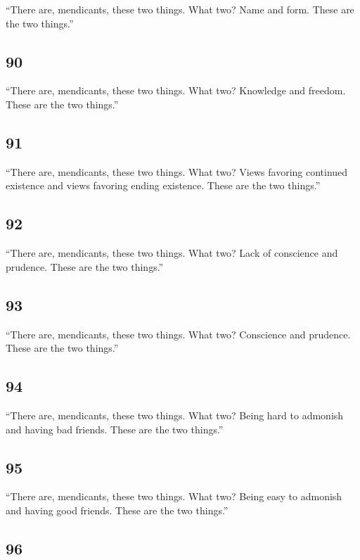 \documentclass[12pt,openany]{book}%
\begin{document}
“There are, mendicants, these two things. What two? Name and form. These are the two things.” 

\subsection*{90 }

“There are, mendicants, these two things. What two? Knowledge and freedom. These are the two things.” 

\subsection*{91 }

“There are, mendicants, these two things. What two? Views favoring continued existence and views favoring ending existence. These are the two things.” 

\subsection*{92 }

“There are, mendicants, these two things. What two? Lack of conscience and prudence. These are the two things.” 

\subsection*{93 }

“There are, mendicants, these two things. What two? Conscience and prudence. These are the two things.” 

\subsection*{94 }

“There are, mendicants, these two things. What two? Being hard to admonish and having bad friends. These are the two things.” 

\subsection*{95 }

“There are, mendicants, these two things. What two? Being easy to admonish and having good friends. These are the two things.” 

\subsection*{96 }
\end{document}
